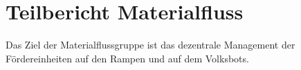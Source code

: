 \section{Teilbericht Materialfluss}
Das Ziel der Materialflussgruppe ist das dezentrale Management der Fördereinheiten auf den Rampen und auf dem Volksbots.












